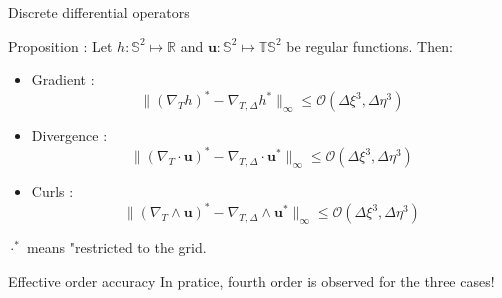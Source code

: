 \documentclass[11pt]{beamer}
\begin{document}
\begin{frame}{Discrete differential operators}
\begin{block}{Proposition :}
Let $h:\mathbb{S}^2 \mapsto \mathbb{R}$ and $\mathbf{u}: \mathbb{S}^2 \mapsto \mathbb{T}\mathbb{S}^2$ be regular functions. Then:

\begin{itemize}
\item Gradient : \begin{equation}
\| (\nabla_{T}h)^* - \nabla_{T,\Delta}h^* \|_{\infty} \leq \mathcal{O} \left( \Delta \xi^3, \Delta \eta^3 \right)
\end{equation}

\item Divergence : \begin{equation}
\| (\nabla_{T}\cdot \mathbf{u})^* - \nabla_{T,\Delta}\cdot \mathbf{u}^* \|_{\infty} \leq \mathcal{O} \left( \Delta \xi^3, \Delta \eta^3 \right) 
\end{equation}

\item Curls : \begin{equation}
\| (\nabla_{T}\wedge \mathbf{u})^* - \nabla_{T,\Delta}\wedge \mathbf{u}^* \|_{\infty}  \leq  \mathcal{O} \left( \Delta \xi^3, \Delta \eta^3 \right)
\end{equation}
\end{itemize}
$\cdot^*$ means "restricted to the grid.
\end{block}

\begin{block}{Effective order accuracy}
In pratice, fourth order is observed for the three cases!
\end{block}
\end{frame}
%
\end{document}
